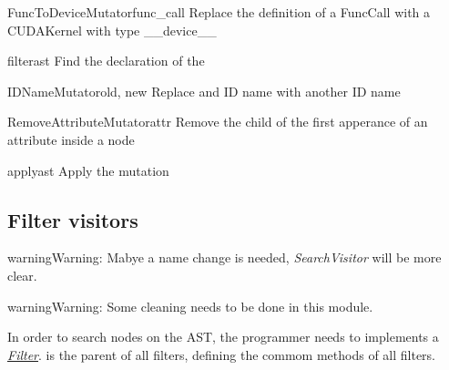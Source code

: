 \documentclass[a4paper,10pt,english]{manual}
\begin{document}
\hypertarget{Backends.Common.Mutators.AstSupport.FuncToDeviceMutator}{}\begin{classdesc}{FuncToDeviceMutator}{func\_call}
Replace the definition of a FuncCall with a CUDAKernel with type \_\_device\_\_

\hypertarget{Backends.Common.Mutators.AstSupport.FuncToDeviceMutator.filter}{}\begin{methoddesc}{filter}{ast}
Find the declaration of the
\end{methoddesc}
\end{classdesc}

\hypertarget{Backends.Common.Mutators.AstSupport.IDNameMutator}{}\begin{classdesc}{IDNameMutator}{old, new}
Replace and ID name with another ID name
\end{classdesc}

\hypertarget{Backends.Common.Mutators.AstSupport.RemoveAttributeMutator}{}\begin{classdesc}{RemoveAttributeMutator}{attr}
Remove the child of the first apperance of an attribute inside a node

\hypertarget{Backends.Common.Mutators.AstSupport.RemoveAttributeMutator.apply}{}\begin{methoddesc}{apply}{ast}
Apply the mutation
\end{methoddesc}
\end{classdesc}


\subsection{Filter visitors}

\begin{notice}{warning}{Warning:}
Mabye a name change is needed, \emph{SearchVisitor} will be more clear.
\end{notice}

\begin{notice}{warning}{Warning:}
Some cleaning needs to be done in this module.
\end{notice}

In order to search nodes on the AST, the programmer needs to implements a \hyperlink{term-filter}{\emph{Filter}}.
 is the parent of all filters, defining the commom methods
of all filters.
\end{document}
